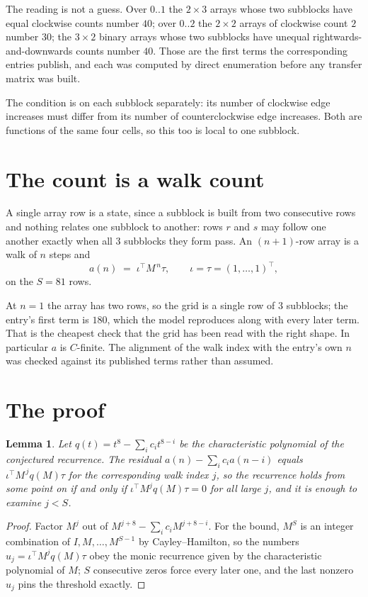 \documentclass[11pt,a4paper]{article}
\theoremstyle{plain}
\newtheorem{lemma}[theorem]{Lemma}
\theoremstyle{definition}
\begin{document}
The reading is not a guess. Over $0..1$ the $2\times3$ arrays whose two subblocks have equal
clockwise counts number $40$; over $0..2$ the $2\times2$ arrays of clockwise count $2$ number
$30$; the $3\times2$ binary arrays whose two subblocks have unequal rightwards-and-downwards
counts number $40$. Those are the first terms the corresponding entries publish, and each was
computed by direct enumeration before any transfer matrix was built.

The condition is on each subblock separately: its number of clockwise edge increases must differ from its number
of counterclockwise edge increases. Both are functions of the same four cells, so this too is local to one
subblock.

\section{The count is a walk count}

A single array row is a state, since a subblock is built from two
consecutive rows and nothing relates one subblock to another: rows $r$ and $s$ may follow one
another exactly when all $3$ subblocks they form pass. An $(n+1)$-row array is a walk of $n$
steps and
\[
a(n)\;=\;\iota^{\!\top}M^{\,n}\tau,\qquad\iota=\tau=(1,\dots,1)^{\!\top},
\]
on the $S=81$ rows.

At $n=1$ the array has two rows, so the grid is a single row of $3$
subblocks; the entry's first term is $180$, which the model
reproduces along with every later term. That is the cheapest check that the grid has been read
with the right shape.
In particular $a$ is $C$-finite. The alignment of the walk index with the entry's own $n$ was
checked against its published terms rather than assumed.

\section{The proof}

\begin{lemma}\label{lem:crit}
Let $q(t)=t^{8}-\sum_i c_it^{8-i}$ be the characteristic polynomial of the
conjectured recurrence. The residual $a(n)-\sum_ic_ia(n-i)$ equals
$\iota^{\!\top}M^{\,j}q(M)\tau$ for the corresponding walk index $j$, so the recurrence
holds from some point on if and only if $\iota^{\!\top}M^{j}q(M)\tau=0$ for all large $j$,
and it is enough to examine $j<S$.
\end{lemma}

\begin{proof}
Factor $M^{j}$ out of $M^{j+8}-\sum_ic_iM^{j+8-i}$. For the bound, $M^{S}$
is an integer combination of $I,M,\dots,M^{S-1}$ by Cayley--Hamilton, so the numbers
$u_j=\iota^{\!\top}M^{j}q(M)\tau$ obey the monic recurrence given by the characteristic
polynomial of $M$; $S$ consecutive zeros force every later one, and the last nonzero $u_j$
pins the threshold exactly.
\end{proof}
\end{document}
